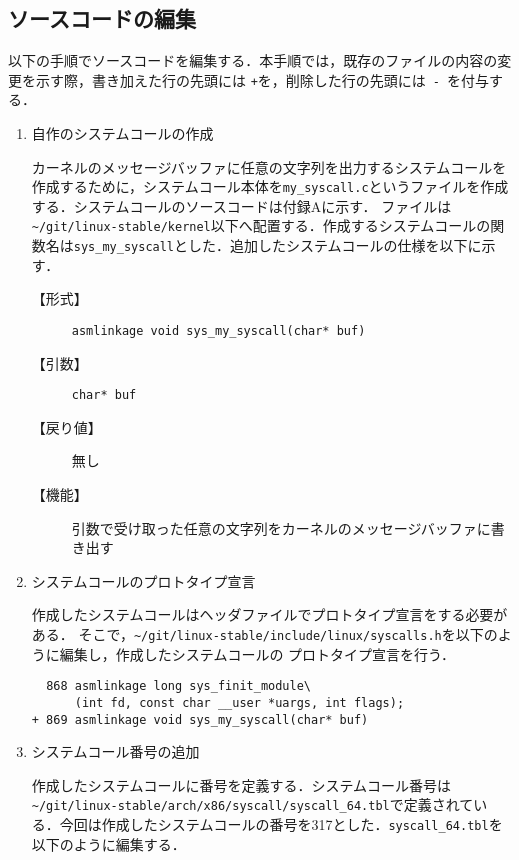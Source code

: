 \documentclass[12pt]{jsarticle}
\begin{document}
\subsection{ソースコードの編集}\label{subsec:edit source code}
以下の手順でソースコードを編集する．本手順では，既存のファイルの内容の変更を示す際，書き加えた行の先頭には
\verb|+|を，削除した行の先頭には\ \verb|-|\ を付与する．
\begin{enumerate}
\item 自作のシステムコールの作成 \label{enum:make systemcall}

カーネルのメッセージバッファに任意の文字列を出力するシステムコールを作成するために，システムコール本体を\verb|my_syscall.c|というファイルを作成する．システムコールのソースコードは付録Aに示す．
ファイルは\verb|~/git/linux-stable/kernel|以下へ配置する．作成するシステムコールの関数名は\verb|sys_my_syscall|とした．追加したシステムコールの仕様を以下に示す．


\begin{description}
\item [【形式】]      \verb|asmlinkage void sys_my_syscall(char* buf)|
\item [【引数】]      \verb|char* buf|
\item [【戻り値】]    無し
\item [【機能】]      引数で受け取った任意の文字列をカーネルのメッセージバッファに書き出す
\end{description}



\item システムコールのプロトタイプ宣言 \label{enum:def systemcall}

作成したシステムコールはヘッダファイルでプロトタイプ宣言をする必要がある．
そこで，\verb|~/git/linux-stable/include/linux/syscalls.h|を以下のように編集し，作成したシステムコールの
プロトタイプ宣言を行う．

\begin{verbatim}
  868 asmlinkage long sys_finit_module\
      (int fd, const char __user *uargs, int flags);
+ 869 asmlinkage void sys_my_syscall(char* buf)
\end{verbatim}


\item システムコール番号の追加 \label{enum:add systemcall number}

作成したシステムコールに番号を定義する．システムコール番号は
\newline
\verb|~/git/linux-stable/arch/x86/syscall/syscall_64.tbl|で定義されている．今回は作成したシステムコールの番号を317とした．\verb|syscall_64.tbl|を以下のように編集する．


\end{enumerate}
\end{document}
